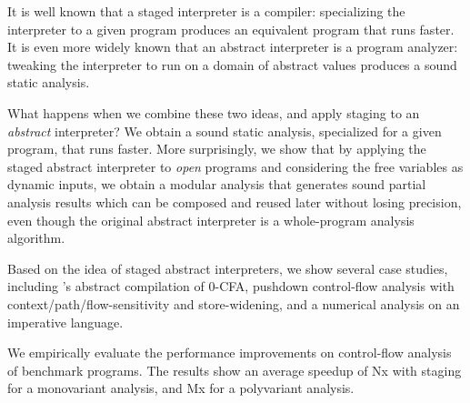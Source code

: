 It is well known that a staged interpreter is a compiler: specializing the interpreter to a given program
produces an equivalent program that runs faster.
It is even more widely known that an abstract interpreter is a program analyzer: tweaking the 
interpreter to run on a domain of abstract values produces a sound static analysis.

What happens when we combine these two ideas, and apply staging to an \emph{abstract} interpreter? 
We obtain a sound static analysis, specialized for a given program, that runs faster.
%
More surprisingly, we show that by applying the staged abstract interpreter to \textit{open} programs and considering the free variables as dynamic inputs, 
we obtain a modular analysis that generates sound partial analysis results which can be composed 
and reused later without losing precision, even though the original abstract interpreter is a whole-program 
analysis algorithm.

Based on the idea of staged abstract interpreters, we show several case studies, including 
\citeauthor{Boucher:1996:ACN:647473.727587}'s abstract compilation of 0-CFA, pushdown
control-flow analysis with context/path/flow-sensitivity and store-widening, and a numerical
analysis on an imperative language.

We empirically evaluate the performance improvements on control-flow analysis of benchmark programs.
The results show an average speedup of Nx with staging for a monovariant analysis, and Mx for 
a polyvariant analysis.







